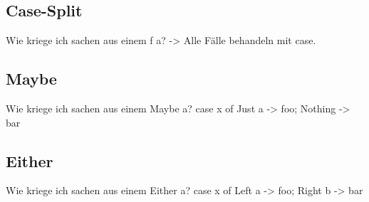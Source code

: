 \documentclass{beamer}
\begin{document}
\subsection{Case-Split}
\begin{frame}
 Wie kriege ich sachen aus einem f a? -> Alle Fälle behandeln mit case.
\end{frame}
\subsection{Maybe}
\begin{frame}
 Wie kriege ich sachen aus einem Maybe a? case x of Just a -> foo; Nothing -> bar
\end{frame}
\subsection{Either}
\begin{frame}
 Wie kriege ich sachen aus einem Either a? case x of Left a -> foo; Right b -> bar
\end{frame}
\end{document}
